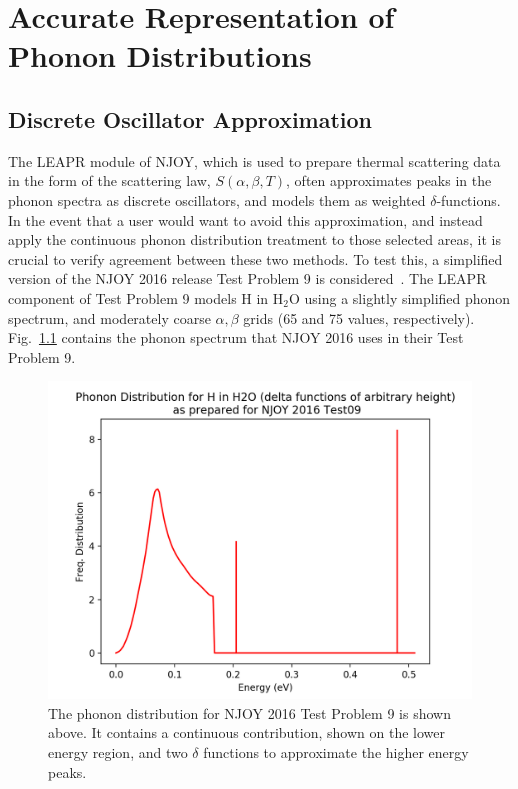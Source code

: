 \documentclass[Master.tex]{subfiles}
\begin{document}
\chapter{Accurate Representation of Phonon Distributions}

        \section{Discrete Oscillator Approximation}\label{sec:test9}
            The LEAPR module of NJOY, which is used to prepare thermal scattering data in the form of the scattering law, $S(\alpha,\beta,T)$, often approximates peaks in the phonon spectra as discrete oscillators, and models them as weighted $\delta$-functions. In the event that a user would want to avoid this approximation, and instead apply the continuous phonon distribution treatment to those selected areas, it is crucial to verify agreement between these two methods. To test this, a simplified version of the NJOY 2016 release Test Problem 9 is considered~\cite{njoy}. The LEAPR component of Test Problem 9 models H in H$_2$O using a slightly simplified phonon spectrum, and moderately coarse $\alpha,\beta$ grids (65 and 75 values, respectively). Fig.~\ref{fig:waterPhonon} contains the phonon spectrum that NJOY 2016 uses in their Test Problem 9. 
                        \begin{figure}[h]
                          \begin{center}
                          \includegraphics[scale=0.7]{waterPhononDist}
                            \caption[Phonon Distribution for NJOY 2016 Test Problem 9]{The phonon distribution for NJOY 2016 Test Problem 9 is shown above. It contains a continuous contribution, shown on the lower energy region, and two $\delta$ functions to approximate the higher energy peaks. }
                          \label{fig:waterPhonon}
                          \end{center}
                        \end{figure}
\end{document}
